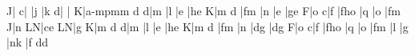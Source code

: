 \barre\NOtes {}\bohlp J|\enotes
\temps\NOtes{}\ql c|\enotes
\temps\NOtes{}|\boqu j\enotes
\barre\NOtes {}|\bohu k\enotes 
\temps\NOtes{}\zql d|\enotes 
\temps\NOtes{}|\soupir\enotes
\barre\NOtes{} \bohlp K|\zcharnote a{\kern -\Interligne\ppff mp}\cna m\hu m\enotes
\temps\NOtes{}\qu d\enotes
\temps\NOtes{}\qu d|\qu m\enotes
\barre\NOtes {}|\hup l\enotes
\temps\NOtes{}|\qu e\enotes
\temps\NOtes{}|\zq h\qu e\enotes
\barre\NOtes {}\bohlp K|\hu m\enotes
\temps\NOtes{}\qu d\enotes
\temps\NOtes{}|\zql f\qu m\enotes
\barre\NOtes {}|\hup n\enotes
\temps\NOtes{}|\qu e\enotes
\temps\NOtes{}|\zq g\qu e\enotes
\barre\NOtes {}\bohup F|\hu o\enotes
\temps\NOtes{}\qu c|\qu f\enotes
\temps\NOtes{}|\zql f\zq h\qu o\enotes
\barre\NOtes {}|\qu q\enotes
\temps\NOtes{}|\qu o\enotes
\temps\NOtes{}|\zql f\qu m\enotes
\barre\NOtes {}\bohlp J|\hu n\enotes 
\temps\NOtes\zq L\qu N|\zq c\qu e\enotes 
\temps\NOtes\zq L\qu N|\qu g\enotes
\ifx\mxversion\undefined\def\atnextline{\autolines665}\fi %
\barre\NOtes{}\bohlp K|\hu m\enotes
\temps\NOtes{}\qu d\enotes
\temps\NOtes{}\qu d|\qu m\enotes
\barre\NOtes {}|\hup l\enotes
\temps\NOtes{}|\qu e\enotes
\temps\NOtes{}|\zq h\qu e\enotes
\barre\NOtes {}\bohlp K|\hu m\enotes
\temps\NOtes{}\qu d\enotes
\temps\NOtes{}|\zql f\qu m\enotes
\barre\NOtes {}|\hup n\enotes
\temps\NOtes{}|\zq d\qu g\enotes
\temps\NOtes{}|\zq d\zq g\enotes
\barre\NOtes {}\bohup F|\hu o\enotes
\temps\NOtes{}\qu c|\qu f\enotes
\temps\NOtes{}|\zql f\zq h\qu o\enotes
\barre\NOtes {}|\qu q\enotes
\temps\NOtes{}|\qu o\enotes
\temps\NOtes{}|\zql f\qu m\enotes
\barre\NOtes {}|\hup l\enotes
\temps\NOtes{}\enotes
\temps\NOtes{}|\ql g\enotes
\barre\NOtes {}\relax
  |\pointdorgue n\hup k\enotes
\temps\NOtes{}|\ql f\enotes
\temps\NOtes\pointdorgue d\ql d\enotes
{}\relax
\finmorceau
   \rightline{\sl \aujourdhui}\eject
\bye






